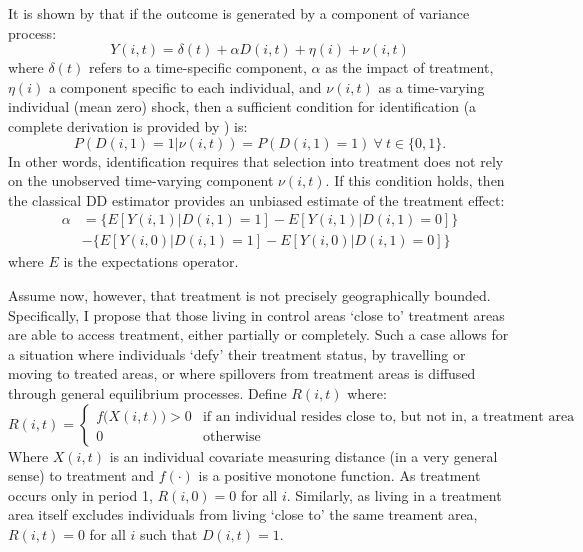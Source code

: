 It is shown by \citet{AshenfelterCard1985} that if the outcome is generated by
a component of variance process:
\begin{equation}
\label{Seqn:COV}
Y(i,t)=\delta(t) + \alpha D(i,t)+\eta(i)+\nu(i,t)
\end{equation}
where $\delta(t)$ refers to a time-specific component, $\alpha$ as the impact of 
treatment, $\eta(i)$ a component specific to each individual, and $\nu(i,t)$ as 
a time-varying individual (mean zero) shock, then a sufficient condition for 
identification (a complete derivation is provided by \citet{Abadie2005}) is:
\begin{equation}
\label{Seqn:ID}
P(D(i,1)=1|\nu(i,t))=P(D(i,1)=1) \ \forall\ t\in\{0,1\}.
\end{equation}
In other words, identification requires that selection into treatment does not
rely on the unobserved time-varying component $\nu(i,t)$.  If this condition 
holds, then the classical DD estimator provides an unbiased estimate of the
treatment effect:
\begin{equation}
\label{Seqn:DD}
\begin{split}
\alpha&=\{E[Y(i,1)|D(i,1)=1]-E[Y(i,1)|D(i,1)=0]\} \\
      &-\{E[Y(i,0)|D(i,1)=1]-E[Y(i,0)|D(i,1)=0]\}
\end{split}
\end{equation}
where $E$ is the expectations operator.

Assume now, however, that treatment is not precisely geographically bounded.  
Specifically, I propose that those living in control areas `close to' treatment 
areas are able to access treatment, either partially or completely.  Such a 
case allows for a situation where individuals `defy' their treatment status, by 
travelling or moving to treated areas, or where spillovers from treatment 
areas is diffused through general equilibrium processes.  Define $R(i,t)$ 
where:
\begin{equation}
\nonumber
 R(i,t) =
  \begin{cases}
   f\Big(X(i,t)\Big)>0   & \text{if an individual resides close to, but not in, a treatment area} \\
   0                            & \text{otherwise} 
  \end{cases}
\end{equation}
Where $X(i,t)$ is an individual covariate measuring distance (in a very general 
sense) to treatment and $f(\cdot)$ is a positive monotone function. As treatment 
occurs only in 
period 1, $R(i,0)=0$ for all $i$.  Similarly, as living in a treatment area 
itself excludes individuals from living `close to' the same treament area, 
$R(i,t)=0$ for all $i$ such that $D(i,t)=1$.

